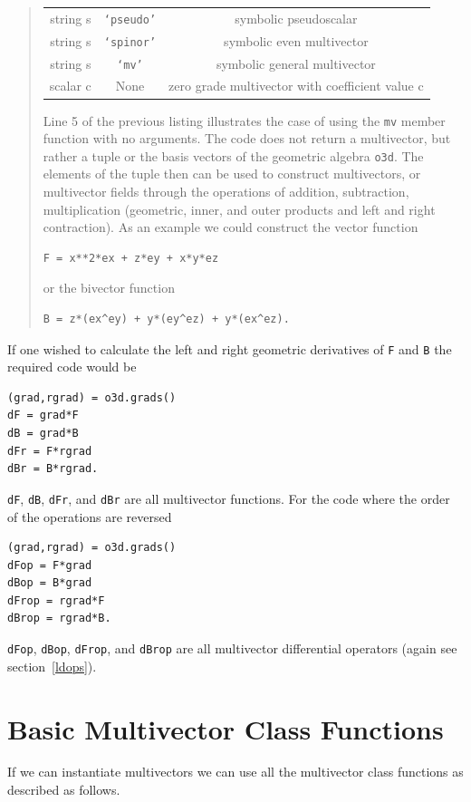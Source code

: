 \documentclass[12pt]{report}
\newcommand{\T}[1]{\texttt{#1}}
\begin{document}
\begin{quote}
\begin{center}
\begin{longtable}{ccc}
         string s &  \T{`pseudo'} & symbolic pseudoscalar \\
         string s &  \T{`spinor'} & symbolic even multivector \\ 
         string s &  \T{`mv'} & symbolic general multivector \\
         scalar c & None  &  zero grade multivector with coefficient value c 
	\end{longtable}
\end{center}
Line 5 of the previous listing illustrates the case of using the \T{mv} member function with
no arguments. The code does not return a multivector, but rather a tuple or the basis vectors of the geometric algebra \T{o3d}.  
The elements of the tuple then can
be used to construct multivectors, or multivector fields through the operations
of addition, subtraction, multiplication (geometric, inner, and outer products and left and right contraction).
As an example we could construct the vector function
\begin{lstlisting}[numbers=none]
F = x**2*ex + z*ey + x*y*ez
\end{lstlisting}	
or the bivector function
\begin{lstlisting}[numbers=none]
B = z*(ex^ey) + y*(ey^ez) + y*(ex^ez).
\end{lstlisting}	
\end{quote}
If one wished to calculate the left and right geometric derivatives of \T{F} and \T{B} the required code would be
\begin{lstlisting}
(grad,rgrad) = o3d.grads()
dF = grad*F
dB = grad*B
dFr = F*rgrad
dBr = B*rgrad.
\end{lstlisting}
\T{dF}, \T{dB}, \T{dFr}, and \T{dBr} are all multivector functions. For the code where the order of the operations are
reversed
\begin{lstlisting}
(grad,rgrad) = o3d.grads()
dFop = F*grad
dBop = B*grad
dFrop = rgrad*F
dBrop = rgrad*B.
\end{lstlisting}
\T{dFop}, \T{dBop}, \T{dFrop}, and \T{dBrop} are all multivector differential operators (again see section~\ref{ldops}).


\section{Basic Multivector Class Functions}

If we can instantiate multivectors we can use all the multivector class functions as described as follows.
\end{document}
